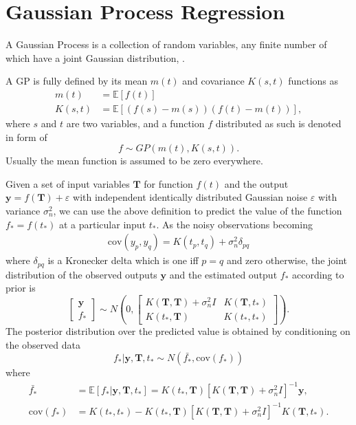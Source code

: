 \section{Gaussian Process Regression}

A Gaussian Process is a collection of random variables, any finite number of which have a joint Gaussian distribution, \cite{b_gpml}.

A GP is fully defined by its mean $m(t)$ and covariance $K(s,t)$ functions as
\begin{align}
m(t)&=\mathbb{E}[f(t)] \\
K(s,t)&=\mathbb{E}[(f(s)-m(s)) (f(t)-m(t))],
\end{align}
where $s$ and $t$ are two variables, and a function $f$ distributed as such is denoted in form of
\begin{equation}
f \sim GP(m(t),K(s,t)).
\end{equation}
Usually the mean function is assumed to be zero everywhere. 

Given a set of input variables $\mathbf{T}$ for function $f(t)$ and the output $\mathbf{y}=f(\mathbf{T})+\varepsilon$ with independent identically distributed Gaussian noise $\varepsilon$ with variance $\sigma_n^2$,  we can use the above definition to predict the value of the function $f_*=f(t_*)$ at a particular input $t_*$. As the noisy observations becoming
\begin{align}\label{covdef}
\text{cov}(y_p,y_q) = K(t_p,t_q)+\sigma_n^2 \delta_{pq}
\end{align}
where $\delta_{pq}$ is a Kronecker delta which is one iff $p=q$ and zero otherwise, the joint distribution of the observed outputs $\mathbf{y}$ and the estimated output $f_*$ according to prior is
\begin{equation}
\left[ \begin{matrix}
\mathbf{y}\\
f_*
\end{matrix} \right] \sim N \left(  
0,\left[   \begin{matrix}
K(\mathbf{T},\mathbf{T}) +\sigma_n^2I& K(\mathbf{T},t_*) \\
K(t_*,\mathbf{T}) & K(t_*,t_*)
\end{matrix}  \right] 
\right).
\end{equation}
The posterior distribution over the predicted value is obtained by conditioning on the observed data
\begin{equation}
f_* | \mathbf{y},\mathbf{T},t_* \sim N(\bar{f_*},\text{cov}(f_*))
\end{equation}
where 
\begin{align}
\bar{f_*}&=\mathbb{E}[f_* | \mathbf{y},\mathbf{T},t_* ]=K(t_*,\mathbf{T})[K(\mathbf{T},\mathbf{T})+\sigma_n^2I]^{-1}\mathbf{y},\\
\text{cov}(f_*)&=K(t_*,t_*)-K(t_*,\mathbf{T})[K(\mathbf{T},\mathbf{T})+\sigma_n^2I]^{-1}K(\mathbf{T},t_*).
\end{align}

